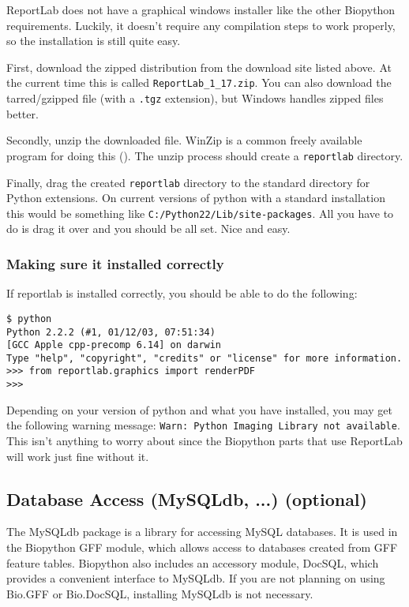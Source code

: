 \documentclass{article}
\begin{document}
ReportLab does not have a graphical windows installer like the other
Biopython requirements. Luckily, it doesn't require any compilation
steps to work properly, so the installation is still quite easy. 


First, download the zipped distribution from the download site listed
above. At the current time this is called \verb|ReportLab_1_17.zip|. You
can also download the tarred/gzipped file (with a \verb|.tgz|
extension), but Windows handles zipped files better.


Secondly, unzip the downloaded file. WinZip is a common freely available
program for doing this
(). The unzip process
should create a \verb|reportlab| directory.


Finally, drag the created \verb|reportlab| directory to the standard
directory for Python extensions. On current versions of python with a
standard installation this would be something like 
\verb|C:/Python22/Lib/site-packages|. All you have to do is drag it over
and you should be all set. Nice and easy.

\subsubsection{Making sure it installed correctly}

If reportlab is installed correctly, you should be able to do the
following:

\begin{verbatim}
$ python 
Python 2.2.2 (#1, 01/12/03, 07:51:34) 
[GCC Apple cpp-precomp 6.14] on darwin
Type "help", "copyright", "credits" or "license" for more information.
>>> from reportlab.graphics import renderPDF
>>> 
\end{verbatim}

Depending on your version of python and what you have installed, you may
get the following warning message: 
\verb|Warn: Python Imaging Library not available|.  This isn't anything
to worry about since the Biopython parts that use ReportLab will work
just fine without it.

\subsection{Database Access (MySQLdb, ...) (optional)}

The MySQLdb package is a library for accessing MySQL databases. It is
used in the Biopython GFF module, which allows access to databases
created from GFF feature tables. Biopython also includes an accessory
module, DocSQL, which provides a convenient interface to MySQLdb. 
If you are not planning on using Bio.GFF or Bio.DocSQL, installing
MySQLdb is not necessary.
\end{document}
